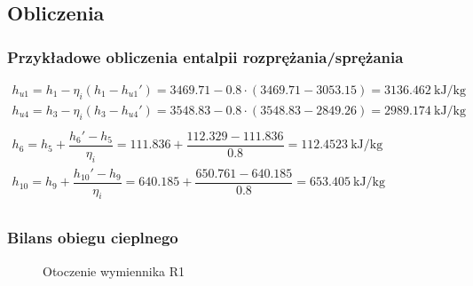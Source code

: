 \subsection{Obliczenia}

\renewcommand{\arraystretch}{1.5}

\subsubsection{Przykładowe obliczenia entalpii rozprężania/sprężania}

\begin{math}
	\begin{array}{l}
		h_{u1} = h_1 - \eta_i ( h_1 - h_{u1}' ) =
			\num{3469,71} - \num{0,8} \cdot ( \num{3469,71} - \num{3053,15} ) =
			\SI{3136,462}{\kilo\joule\per\kilogram} \\
		h_{u4} = h_3 - \eta_i ( h_3 - h_{u4}' ) =
			\num{3548,83} - \num{0,8} \cdot ( \num{3548,83} - \num{2849,26} ) =
			\SI{2989,174}{\kilo\joule\per\kilogram} \\
		\\
		h_6 = h_5 + \dfrac{h_6' - h_5}{\eta_i} =
			\num{111,836} + \dfrac{\num{112,329} - \num{111,836}}{\num{0,8}} =
			\SI{112,4523}{\kilo\joule\per\kilogram} \\
		h_{10} = h_9 + \dfrac{h_{10}' - h_9}{\eta_i} =
			\num{640,185} + \dfrac{\num{650,761} - \num{640,185}}{\num{0,8}} =
			\SI{653,405}{\kilo\joule\per\kilogram} \\
	\end{array}
\end{math}


\subsubsection{Bilans obiegu cieplnego}

\begin{figure}[H]
	\centering

	\caption{Otoczenie wymiennika R1}
\end{figure}

